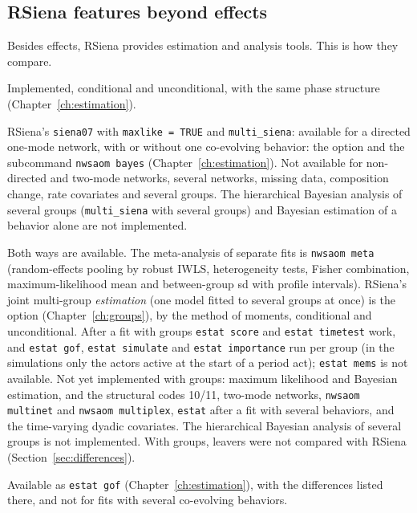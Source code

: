 \subsection{RSiena features beyond effects}\label{sec:est-notimpl}
Besides effects, RSiena provides estimation and analysis tools. This is how they compare.
\begin{description}[leftmargin=0pt,labelindent=0pt]
\item[Method of moments (\texttt{siena07}).] Implemented, conditional and unconditional, with the same phase structure (Chapter~\ref{ch:estimation}).
\item[Maximum likelihood and Bayesian estimation.] RSiena's \texttt{siena07} with \texttt{maxlike = TRUE} and \texttt{multi\_siena}: available for a directed one-mode network, with or without one co-evolving behavior: the option  and the subcommand \texttt{nwsaom bayes} (Chapter~\ref{ch:estimation}). Not available for non-directed and two-mode networks, several networks, missing data, composition change, rate covariates and several groups. The hierarchical Bayesian analysis of several groups (\texttt{multi\_siena} with several groups) and Bayesian estimation of a behavior alone are not implemented.
\item[Multi-group analysis (\texttt{siena08}, \texttt{sienaGroupCreate}).] Both ways are available. The meta-analysis of separate fits is \texttt{nwsaom meta} (random-effects pooling by robust IWLS, heterogeneity tests, Fisher combination, maximum-likelihood mean and between-group sd with profile intervals). RSiena's joint multi-group \emph{estimation} (one model fitted to several groups at once) is the option  (Chapter~\ref{ch:groups}), by the method of moments, conditional and unconditional. After a fit with groups \texttt{estat score} and \texttt{estat timetest} work, and \texttt{estat gof}, \texttt{estat simulate} and \texttt{estat importance} run per group (in the simulations only the actors active at the start of a period act); \texttt{estat mems} is not available. Not yet implemented with groups: maximum likelihood and Bayesian estimation,  and the structural codes 10/11, two-mode networks, \texttt{nwsaom multinet} and \texttt{nwsaom multiplex}, \texttt{estat} after a fit with several behaviors, and the time-varying dyadic covariates. The hierarchical Bayesian analysis of several groups is not implemented. With groups, leavers were not compared with RSiena (Section~\ref{sec:differences}).
\item[Goodness of fit (\texttt{sienaGOF}).] Available as \texttt{estat gof} (Chapter~\ref{ch:estimation}), with the differences listed there, and not for fits with several co-evolving behaviors.

\end{description}
